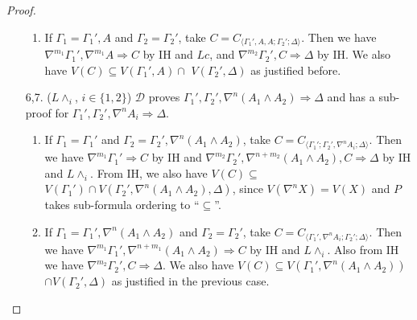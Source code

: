 \documentclass[12pt,a4paper]{article}
\theoremstyle{plain}
\theoremstyle{definition}
\begin{document}
\begin{proof}
\begin{enumerate}
\begin{enumerate}
			\item If $\Gamma_1 = \Gamma_1' , A$ and $\Gamma_2 = \Gamma_2'$, take $C = C_{\langle\Gamma_1',A,A;\Gamma_2';\Delta\rangle}$. Then we have $\nabla^{m_1} \Gamma_1', \nabla^{m_1} A \Rightarrow C$ by IH and $Lc$, and $\nabla^{m_2} \Gamma_2' , C \Rightarrow \Delta$ by IH. We also have $V(C) \subseteq V(\Gamma_1',A) \cap$ $V(\Gamma_2',\Delta)$ as justified before.
		\end{enumerate}

		\item[6,7.] ($L\land_i$, {\small$i \in \{1,2\}$}) $\mathcal{D}$ proves $\Gamma_1' , \Gamma_2' , \nabla^n (A_1 \land A_2) \Rightarrow \Delta$ and has a sub-proof for $\Gamma_1' , \Gamma_2' , \nabla^n A_i \Rightarrow \Delta$.
		\begin{enumerate}
			\item If $\Gamma_1 = \Gamma_1'$ and $\Gamma_2 = \Gamma_2' , \nabla^n (A_1 \land A_2)$, take $C = C_{\langle\Gamma_1';\Gamma_2',\nabla^n A_i;\Delta\rangle}$. Then we have $\nabla^{m_1} \Gamma_1' \Rightarrow C$ by IH and $\nabla^{m_2} \Gamma_2' , \nabla^{n+m_2} (A_1 \land A_2), C \Rightarrow \Delta$ by IH and $L\land_i$. From IH, we also have $V(C) \subseteq$ $V(\Gamma_1') \cap V(\Gamma_2',\nabla^n(A_1 \land A_2),\Delta)$, since $V(\nabla^n X) = V(X)$ and $P$ takes sub-formula ordering to ``$\subseteq$''.
			
			\item If $\Gamma_1 = \Gamma_1' , \nabla^n (A_1 \land A_2)$ and $\Gamma_2 = \Gamma_2'$, take $C = C_{\langle\Gamma_1',\nabla^n A_i;\Gamma_2';\Delta\rangle}$. Then we have $\nabla^{m_1} \Gamma_1',\nabla^{n+m_1} (A_1 \wedge A_2) \Rightarrow C$ by IH and $L\wedge_i$. Also from IH we have $\nabla^{m_2} \Gamma_2', C \Rightarrow \Delta$. We also have $V(C) \subseteq V(\Gamma_1',\nabla^n (A_1 \land A_2))$ $\cap V(\Gamma_2',\Delta)$ as justified in the previous case.
		\end{enumerate}
		\setcounter{enumi}{7}


\end{enumerate}
\end{proof}
\end{document}
